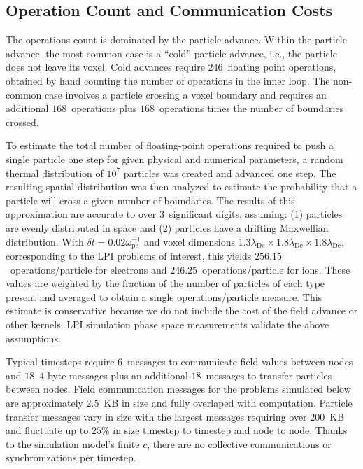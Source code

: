 \documentclass[journal,twoside]{IEEEtran}
\newcommand{\lde}      {\lambda_{\mathrm{De}}}
\newcommand{\wpe}      {\omega_{\mathrm{pe}}}
\begin{document}
\subsection{Operation Count and Communication Costs}

The operations count is dominated by the particle advance.  Within the
particle advance, the most common case is a ``cold'' particle advance,
i.e., the particle does not leave its voxel.  Cold advances require
$246$~floating point operations, obtained by hand counting the number
of operations in the inner loop.  The non-common case involves a
particle crossing a voxel boundary and requires an additional
$168$~operations plus $168$~operations times the number of boundaries
crossed.

To estimate the total number of floating-point operations required to
push a single particle one step for given physical and numerical
parameters, a random thermal distribution of $10^7$ particles was
created and advanced one step.  The resulting spatial distribution was
then analyzed to estimate the probability that a particle will cross a
given number of boundaries.  The results of this approximation are
accurate to over $3$~significant digits, assuming: (1) particles are
evenly distributed in space and (2) particles have a drifting
Maxwellian distribution.  With $\delta t = 0.02 \wpe^{-1}$ and voxel
dimensions $1.3\lde \times 1.8\lde \times 1.8\lde$, corresponding to
the LPI problems of interest, this yields $256.15$~operations/particle
for electrons and $246.25$~operations/particle for ions.  These values
are weighted by the fraction of the number of particles of each type
present and averaged to obtain a single operations/particle measure.
This estimate is conservative because we do not include the cost of
the field advance or other kernels.  LPI simulation phase space
measurements validate the above
assumptions.~\cite{Yin_et_al_Phys_Plasmas_2007_SRS}

Typical timesteps require $6$~messages to communicate field values
between nodes and $18$~$4$-byte messages plus an additional
$18$~messages to transfer particles between nodes.  Field
communication messages for the problems simulated below are
approximately $2.5$~KB in size and fully overlaped with computation.
Particle transfer messages vary in size with the largest messages
requiring over $200$~KB and fluctuate up to $25\%$ in size timestep to
timestep and node to node.  Thanks to the simulation model's finite
$c$, there are no collective communications or synchronizations per
timestep.
\end{document}
